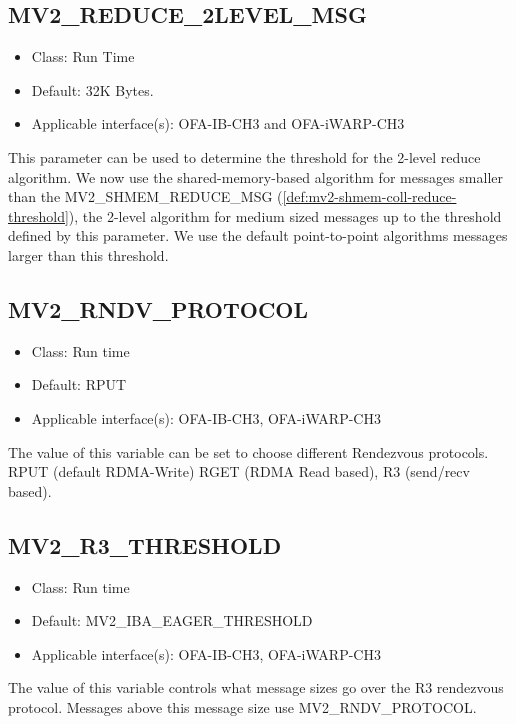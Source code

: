 \subsection{MV2\_REDUCE\_2LEVEL\_MSG} 
\label{def:mv2_reduce_2level_msg}
\begin{itemize}
    \item Class: Run Time
    \item Default: 32K Bytes. 
    \item Applicable interface(s): OFA-IB-CH3 and OFA-iWARP-CH3
\end{itemize}
This parameter can be used to determine the threshold for the 
2-level reduce algorithm. We now use the shared-memory-based 
algorithm for messages smaller than the MV2\_SHMEM\_REDUCE\_MSG
(\ref{def:mv2-shmem-coll-reduce-threshold}), 
the 2-level algorithm for medium sized messages up to the threshold 
defined by this parameter. We use the default point-to-point algorithms messages
larger than this threshold. 

\subsection{MV2\_RNDV\_PROTOCOL}
\label{def:mv2_rndv_protocol}
\begin{itemize}
    \item Class: Run time
    \item Default: RPUT
    \item Applicable interface(s): OFA-IB-CH3, OFA-iWARP-CH3
\end{itemize}
The value of this variable can be set to choose different Rendezvous
protocols. RPUT (default RDMA-Write) RGET (RDMA Read based), R3
(send/recv based).

\subsection{MV2\_R3\_THRESHOLD}
\label{def:mv2_r3_threshold}
\begin{itemize}
    \item Class: Run time
    \item Default: MV2\_IBA\_EAGER\_THRESHOLD
    \item Applicable interface(s): OFA-IB-CH3, OFA-iWARP-CH3
\end{itemize}

The value of this variable controls what message sizes go over the 
R3 rendezvous protocol. Messages above this message size use
MV2\_RNDV\_PROTOCOL. 

